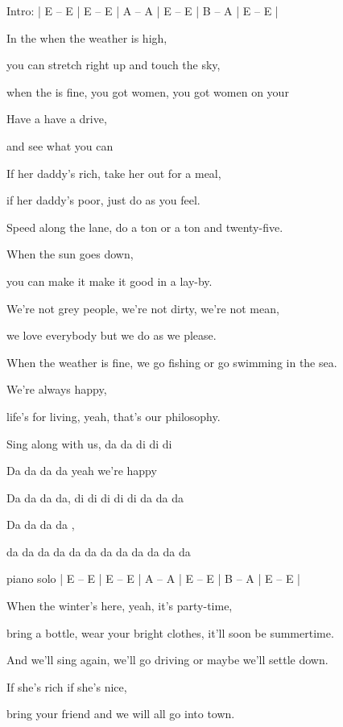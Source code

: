 

Intro:  
| E – E | E – E | A – A | E – E | B – A | E – E | 

\zs
In the  when the weather is high,
                              
you can stretch right up and touch the sky,

when the  is fine, you got women, you got women on your         

Have a  have a drive, 

 and see what you can 
\ks

\zs
If her daddy's rich, take her out for a meal,
                           
if her daddy's poor, just do as you feel.

Speed along the lane, do a ton or a ton and twenty-five.
         
When the sun goes down,   

you can make it make it good in a lay-by.
\ks

\zs
We're not grey people, we're not dirty, we're not mean,
                             
we love everybody but we do as we please.

When the weather is fine, we go fishing or go swimming in the sea.      

We're always happy,

life's for living, yeah, that's our philosophy.
\ks

\zs
Sing along with us, da da di di di 
                       
Da da da da yeah we’re happy 

Da da da da, di di di di di da da da 

Da da da da , 

da da da da da da da da da da da da 
\ks

piano solo 
| E – E | E – E | A – A | E – E | B – A | E – E | 


\zs
When the winter's here, yeah, it's party-time, 
                                                       
bring a bottle, wear your bright clothes, it'll soon be summertime.

And we'll sing again, we'll go driving or maybe we'll settle down.    
                
If she's rich if she's nice, 

bring your friend and we will all go into town.
\ks

\kp